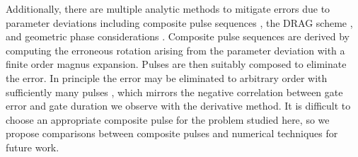 Additionally, there are multiple analytic methods 
to mitigate errors due to parameter deviations
including composite pulse sequences \cite{merrill2014progress},
the DRAG scheme \cite{krantz2019quantum}, and
geometric phase considerations
\cite{xu2020nonadiabatic, han2020experimental}.
Composite pulse sequences are derived by computing
the erroneous rotation arising from the parameter deviation
with a finite order magnus expansion.
Pulses are then suitably composed to eliminate the
error. In principle the error may be eliminated
to arbitrary order with sufficiently many pulses \cite{merill2014progress},
which mirrors the negative correlation between
gate error and gate duration we observe with the derivative method.
It is difficult to choose an appropriate composite pulse
for the problem studied here,
so we propose comparisons between composite pulses and numerical techniques
for future work.
